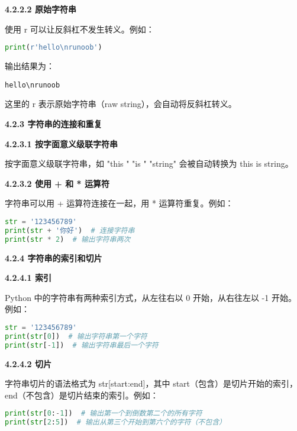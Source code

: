 \textbf{4.2.2.2 原始字符串}

使用 r 可以让反斜杠不发生转义。例如：

\begin{lstlisting}[language=python]
print(r'hello\nrunoob')
\end{lstlisting}

输出结果为：

\begin{lstlisting}[language=pythonC]
hello\nrunoob
\end{lstlisting}

这里的 r 表示原始字符串（raw string），会自动将反斜杠转义。

\textbf{4.2.3 字符串的连接和重复}

\textbf{4.2.3.1 按字面意义级联字符串}

按字面意义级联字符串，如 "this " "is " "string" 会被自动转换为 this is string。

\textbf{4.2.3.2 使用 + 和 * 运算符}

字符串可以用 + 运算符连接在一起，用 * 运算符重复。例如：

\begin{lstlisting}[language=python]
str = '123456789'
print(str + '你好')  # 连接字符串
print(str * 2)  # 输出字符串两次
\end{lstlisting}

\textbf{4.2.4 字符串的索引和切片}

\textbf{4.2.4.1 索引}

Python 中的字符串有两种索引方式，从左往右以 0 开始，从右往左以 -1 开始。例如：

\begin{lstlisting}[language=python]
str = '123456789'
print(str[0])  # 输出字符串第一个字符
print(str[-1])  # 输出字符串最后一个字符
\end{lstlisting}

\textbf{4.2.4.2 切片}

字符串切片的语法格式为 str[start:end]，其中 start（包含）是切片开始的索引，end（不包含）是切片结束的索引。例如：

\begin{lstlisting}[language=python]
print(str[0:-1])  # 输出第一个到倒数第二个的所有字符
print(str[2:5])  # 输出从第三个开始到第六个的字符（不包含）
\end{lstlisting}
